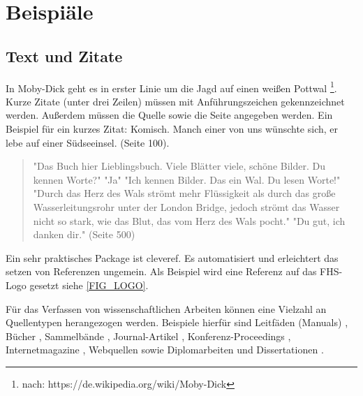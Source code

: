 \chapter{Beispiäle}

\thispagestyle{standard}
\pagestyle{standard}

\section{Text und Zitate}

In Moby-Dick geht es in erster Linie um die Jagd auf einen weißen Pottwal \footnote{nach: https://de.wikipedia.org/wiki/Moby-Dick}. Kurze Zitate (unter drei Zeilen) müssen mit Anführungszeichen gekennzeichnet werden. Außerdem müssen die Quelle sowie die Seite angegeben werden. Ein Beispiel für ein kurzes Zitat: \glqq Komisch. Manch einer von uns wünschte sich, er lebe auf einer Südseeinsel.\grqq \cite{MELVILLE:MOBYDICK1997} (Seite 100).

  \begin{quote}
"Das Buch hier Lieblingsbuch. Viele Blätter viele, schöne Bilder. Du kennen Worte?"\newline
"Ja"\newline
"Ich kennen Bilder. Das ein Wal. Du lesen Worte!"\newline
"Durch das Herz des Wals strömt mehr Flüssigkeit als durch das große Wasserleitungsrohr unter der London Bridge, jedoch strömt das Wasser nicht so stark, wie das Blut, das vom Herz des Wals pocht."\newline
"Du gut, ich danken dir."  \upshape \cite{MELVILLE:MOBYDICK1997} (Seite 500)
  \end{quote}

Ein sehr praktisches Package ist cleveref. Es automatisiert und erleichtert das setzen von Referenzen ungemein. Als Beispiel wird eine Referenz auf das FHS-Logo gesetzt siehe \cref{FIG_LOGO}.

Für das Verfassen von wissenschaftlichen Arbeiten können eine Vielzahl an Quellentypen herangezogen werden. Beispiele hierfür sind Leitfäden (Manuals) \citep{RFC2828} \citep{80211i} \citep{80211} \cite{X800} \citep{TR102377} \citep{EN301893} \citep{PUB197} \citep{PUB74}, Bücher \citep{Fis04a} \citep{Rei05a} \citep{Tan00a} \citep{Ste04a} \citep{GMS00a} \citep{HL98a}, Sammelbände \citep{EHL00a} \citep{Sch94a}, Journal-Artikel \citep{TM03a} \citep{CP03a}, Konferenz-Proceedings \citep{HCB00a} \citep{KBW04a} \citep{KSW04a} \citep{HK05a}, Internetmagazine \citep{Eke05a}, Webquellen \cite{nist} \cite{php} \cite{BDKMT93a} \cite{IDSSM} sowie Diplomarbeiten und Dissertationen \citep{Sch98} \cite{Hae94a}.

